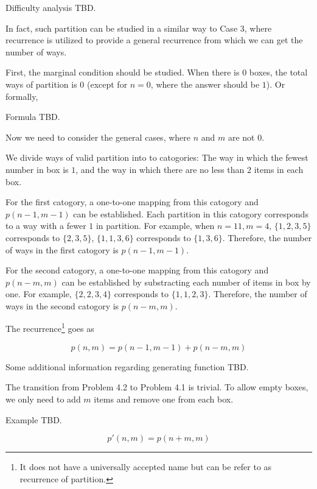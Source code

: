 \documentclass[a4paper]{article}
\begin{document}
Difficulty analysis TBD.

In fact, such partition can be studied in a similar way to Case 3, where recurrence is utilized to provide a general recurrence from which we can get the number of ways. 

First, the marginal condition should be studied. When there is $0$ boxes, the total ways of partition is $0$ (except for $n = 0$, where the answer should be $1$). Or formally, 

Formula TBD.

Now we need to consider the general cases, where $n$ and $m$ are not $0$.

We divide ways of valid partition into to catogories: The way in which the fewest number in box is $1$, and the way in which there are no less than $2$ items in each box. 

For the first catogory, a one-to-one mapping from this catogory and $p(n-1, m-1)$ can be established. Each partition in this catogory corresponds to a way with a fewer $1$ in partition. For example, when $n = 11, m = 4$, $\{1, 2, 3, 5\}$ corresponds to $\{2, 3, 5\}$, $\{1, 1, 3, 6\}$ corresponds to $\{1, 3, 6\}$. Therefore, the number of ways in the first catogory is $p(n-1, m-1)$.

For the second catogory, a one-to-one mapping from this catogory and $p(n-m, m)$ can be established by substracting each number of items in box by one. For example, $\{2, 2, 3, 4\}$ corresponds to $\{1, 1, 2, 3\}$. Therefore, the number of ways in the second catogory is $p(n-m, m)$.

The recurrence\footnote{It does not have a universally accepted name but can be refer to as recurrence of partition.} goes as 

\begin{equation*}
    p(n, m) = p(n-1, m-1) + p(n-m, m)
\end{equation*}

Some additional information regarding generating function TBD.

The transition from Problem 4.2 to Problem 4.1 is trivial. To allow empty boxes, we only need to add $m$ items and remove one from each box.

Example TBD. 

\begin{equation*}
    p'(n, m) = p(n + m, m)
\end{equation*}
\end{document}
